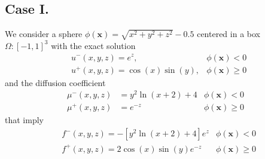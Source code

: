 \documentclass{elsarticle}
\begin{document}
%



\subsection{Case I.}
We consider a sphere $\phi(\mathbf{x})=\sqrt{x^2 + y^2 + z^2} - 0.5$ centered in a box $\Omega:[-1,1]^3$ with the exact solution
\begin{align*}
& u^-(x,y,z)=e^{z}, & \phi(\mathbf{x})<0\\
& u^+(x,y,z)=\cos(x)\sin(y), & \phi(\mathbf{x})\ge 0
\end{align*}
and the diffusion coefficient
\begin{align*}
\mu^-(x,y,z)&=y^2 \ln(x+2) + 4 &\phi(\mathbf{x})<0 \\
\mu^+(x,y,z)&=e^{-z} &\phi(\mathbf{x})\ge 0 
\end{align*}
that imply
\begin{align*}
&f^-(x,y,z)=-[y^2\ln(x+2) + 4] e^{z} &\phi(\mathbf{x})< 0\\
&f^+(x,y,z)=2\cos(x)\sin(y)e^{-z} &\phi(\mathbf{x})\ge 0
\end{align*}
\end{document}
